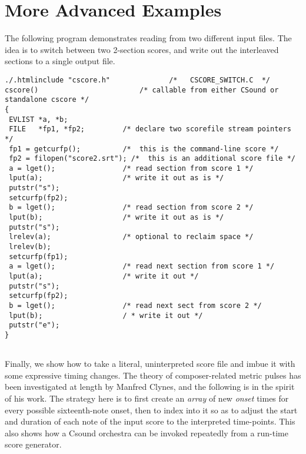 \begin{comment}
\documentclass[10pt]{article}
\usepackage{fullpage, graphicx, url}
\setlength{\parskip}{1ex}
\setlength{\parindent}{0ex}
\title{More Advanced Examples}



\begin{tabular}{ccc}
The Alternative Csound Reference Manual & & \\
Previous &Cscore &Next

\end{tabular}

\end{comment}
\section{More Advanced Examples}


  The following program demonstrates reading from two different input files. The idea is to switch between two 2-section scores, and write out the interleaved sections to a single output file. 


 


 
\begin{lstlisting}
./.htmlinclude "cscore.h"              /*   CSCORE_SWITCH.C  */ 
cscore()                        /* callable from either CSound or standalone cscore */ 
{ 
 EVLIST *a, *b; 
 FILE   *fp1, *fp2;         /* declare two scorefile stream pointers */ 
 fp1 = getcurfp();          /*  this is the command-line score */ 
 fp2 = filopen("score2.srt"); /*  this is an additional score file */ 
 a = lget();                /* read section from score 1 */ 
 lput(a);                   /* write it out as is */ 
 putstr("s"); 
 setcurfp(fp2); 
 b = lget();                /* read section from score 2 */ 
 lput(b);                   /* write it out as is */ 
 putstr("s"); 
 lrelev(a);                 /* optional to reclaim space */ 
 lrelev(b); 
 setcurfp(fp1); 
 a = lget();                /* read next section from score 1 */ 
 lput(a);                   /* write it out */ 
 putstr("s"); 
 setcurfp(fp2); 
 b = lget();                /* read next sect from score 2 */ 
 lput(b);                   / * write it out */ 
 putstr("e");
}
      
\end{lstlisting}


 


  Finally, we show how to take a literal, uninterpreted score file and imbue it with some expressive timing changes. The theory of composer-related metric pulses has been investigated at length by Manfred Clynes, and the following is in the spirit of his work. The strategy here is to first create an \emph{array}
 of new \emph{onset }
times for every possible sixteenth-note onset, then to index into it so as to adjust the start and duration of each note of the input score to the interpreted time-points. This also shows how a\emph{ }
Csound orchestra can be invoked repeatedly from a run-time score generator. 


